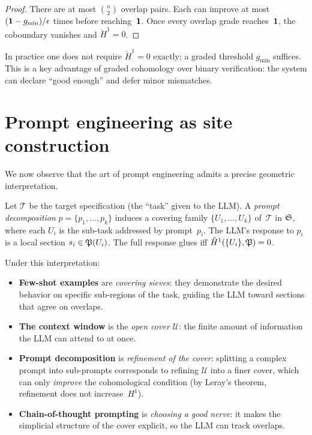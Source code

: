 \begin{proof}
There are at most $\binom{n}{2}$ overlap pairs.  Each
can improve at most $(\mathbf{1} - g_{\min})/\epsilon$ times before
reaching~$\mathbf{1}$.  Once every overlap grade reaches~$\mathbf{1}$, the
coboundary vanishes and $\check{H}^1 = 0$.
\end{proof}

\begin{remark}
In practice one does not require $\check{H}^1 = 0$ exactly; a graded
threshold $g_{\min}$ suffices.  This is a key advantage of graded
cohomology over binary verification: the system can declare
``good enough'' and defer minor mismatches.
\end{remark}

\section{Prompt engineering as site construction}
\label{sec:prompt-site}

We now observe that the art of prompt engineering admits a precise
geometric interpretation.

\begin{proposition}
\label{prop:prompt-cover}
Let $\mathcal{T}$ be the target specification (the ``task'' given
to the LLM).  A \emph{prompt decomposition}
$p = \{p_1, \dots, p_k\}$ induces a covering family
$\{U_1, \dots, U_k\}$ of~$\mathcal{T}$ in $\mathfrak{S}$, where each
$U_i$ is the sub-task addressed by prompt~$p_i$.  The LLM's response
to $p_i$ is a local section $s_i \in \mathfrak{P}(U_i)$.  The full
response glues iff $\check{H}^1(\{U_i\}, \mathfrak{P}) = 0$.
\end{proposition}

Under this interpretation:
\begin{itemize}
  \item \textbf{Few-shot examples} are \emph{covering sieves}:
        they demonstrate the desired behavior on specific
        sub-regions of the task, guiding the LLM toward sections
        that agree on overlaps.
  \item \textbf{The context window} is the \emph{open cover}
        $\mathcal{U}$: the finite amount of information the LLM can
        attend to at once.
  \item \textbf{Prompt decomposition} is \emph{refinement of the
        cover}: splitting a complex prompt into sub-prompts
        corresponds to refining $\mathcal{U}$ into a finer cover,
        which can only \emph{improve} the cohomological condition
        (by Leray's theorem, refinement does not increase~$H^1$).
  \item \textbf{Chain-of-thought prompting} is \emph{choosing a good
        nerve}: it makes the simplicial structure of the cover
        explicit, so the LLM can track overlaps.
\end{itemize}

